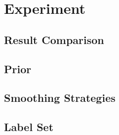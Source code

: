 \section{Experiment}

\subsection{Result Comparison}

\subsection{Prior}

\subsection{Smoothing Strategies}

\subsection{Label Set}


